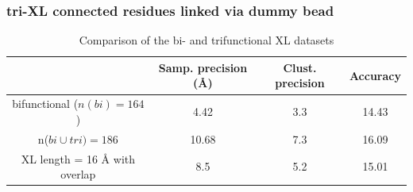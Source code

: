 \documentclass[a4paper,8pt]{beamer}
\begin{document}
\begin{frame}
\frametitle{tri-XL connected residues linked via dummy bead}
%
\begin{table}
  \centering
  \caption{Comparison of the bi- and trifunctional XL datasets}
  \begin{tabular}{|c|c|c|c|}
      \hline
                                   & Samp. precision ({\AA}) & Clust. precision & Accuracy\\ \hline
      bifunctional ($n(bi) = 164$) & 4.42  & 3.3 & 14.43 \\\hline
      n($bi \cup tri) = 186$       & 10.68 & 7.3 &  16.09 \\\hline
      XL length = 16 {\AA} with overlap & 8.5   & 5.2 & 15.01 \\\hline
  \end{tabular}
\end{table}
\end{frame}
%
\end{document}
